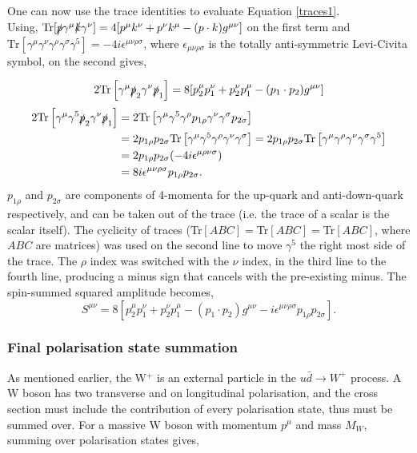 \documentclass[a4paper,11pt]{article}
\begin{document}
One can now use the trace identities to evaluate Equation \ref{traces1}.\\
Using, $ \text{Tr}[\slashed{p}\gamma^\mu \slashed{k} \gamma^\nu] = 4[p^\mu k^\nu + p^\nu k^\mu - (p \cdot k) g^{\mu \nu}]$ on the first term and $\text{Tr}[\gamma^\mu \gamma^\nu \gamma^\rho \gamma^\sigma \gamma^5] = -4i\epsilon^{\mu \nu \rho \sigma}$, where $\epsilon_{\mu \nu \rho \sigma}$ is the totally anti-symmetric Levi-Civita symbol, on the second gives,

\begin{equation}\label{traces_first_term}
	\begin{aligned}
		2\text{Tr}\left[\gamma^\mu \slashed{p}_2\gamma^\nu \slashed{p}_1 \right] = 8[p_2^\mu p_1^\nu + p_2^\nu p_1^\mu - (p_1 \cdot p_2) g^{\mu \nu}]
	\end{aligned}
\end{equation}
\begin{equation}\label{traces_second_term}
	\begin{aligned}
	2\text{Tr}\left[ \gamma^\mu \gamma^5 \slashed{p}_2\gamma^\nu \slashed{p}_1 \right] &=   	2\text{Tr}\left[ \gamma^\mu \gamma^5  \gamma^\rho p_{1\rho} \gamma^\nu \gamma^\sigma p_{2\sigma} \right]\\ 
	&= 2p_{1\rho}p_{2\sigma}\text{Tr}\left[ \gamma^\mu \gamma^5 \gamma^\rho \gamma^\nu \gamma^\sigma \right]= 2p_{1\rho}p_{2\sigma}\text{Tr}\left[ \gamma^\mu \gamma^\rho \gamma^\nu \gamma^\sigma \gamma^5 \right] \\
	&=  2p_{1\rho}p_{2\sigma} (-4i \epsilon^{\mu \rho\nu\sigma})\\
	&= 8i \epsilon^{\mu \nu \rho \sigma}p_{1\rho}p_{2\sigma}.
	\end{aligned}
\end{equation}
$p_{1\rho}$ and $p_{2 \sigma}$ are components of 4-momenta for the up-quark and anti-down-quark respectively, and can be taken out of the trace (i.e. the trace of a scalar is the scalar itself). The cyclicity of traces (Tr$[ABC]=$Tr$[ABC]=$Tr$[ABC]$, where $ABC$ are matrices) was used on the second line to move $\gamma^5$ the right most side of the trace. The $\rho$ index was switched with the $\nu$ index, in the third line to the fourth line, producing a minus sign that cancels with the pre-existing minus. The spin-summed squared amplitude becomes, $$S^{\mu\nu}= 8[p_2^\mu p_1^\nu + p_2^\nu p_1^\mu - (p_1 \cdot p_2) g^{\mu \nu} -i \epsilon^{\mu \nu \rho \sigma}p_{1\rho}p_{2\sigma}].$$ 

\subsubsection{Final polarisation state summation}\label{pol}
As mentioned earlier, the W$^{+}$ is an external particle in the $u\bar{d} \rightarrow W^+$ process. A W boson has two transverse and on longitudinal polarisation, and the cross section must include the contribution of every polarisation state, thus must be summed over. For a massive W boson with momentum $p^\mu$ and mass $M_W$, summing over polarisation states gives,
\end{document}
